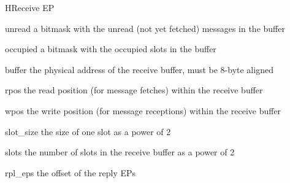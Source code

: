 \begin{register}{H}{Receive EP}{}
  \regnewline%
  \regnewline%
  \regnewline%
  \begin{regdesc}\begin{reglist}
    \item[unread] a bitmask with the unread (not yet fetched) messages in the buffer
    \item[occupied] a bitmask with the occupied slots in the buffer
    \item[buffer] the physical address of the receive buffer, must be 8-byte aligned
    \item[rpos] the read position (for message fetches) within the receive buffer
    \item[wpos] the write position (for message receptions) within the receive buffer
    \item[slot\_size] the size of one slot as a power of 2
    \item[slots] the number of slots in the receive buffer as a power of 2
    \item[rpl\_eps] the offset of the reply EPs
  \end{reglist}\end{regdesc}
\end{register}

